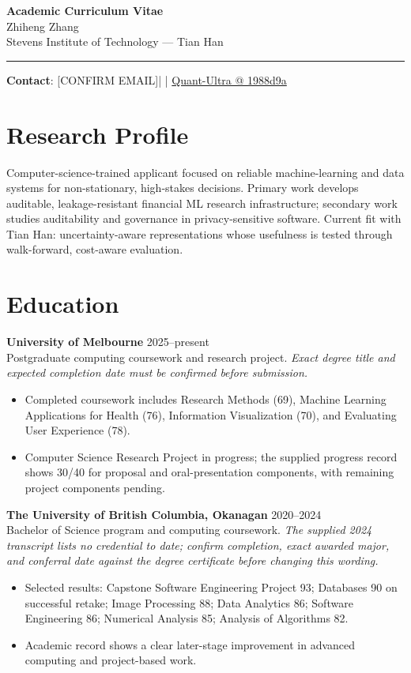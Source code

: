 \documentclass[11pt]{article}
\makeatletter
\newcommand{\ApplicantName}{Zhiheng Zhang}
\newcommand{\ApplicantEmail}{[CONFIRM EMAIL]}
\newcommand{\ApplicantPhone}{[CONFIRM PHONE]}
\newcommand{\ApplicantGitHub}{\href{https://github.com/zhiheng-zhang-Mera/Quant-Ultra/tree/1988d9a8530da91a8158de864d098ea869098923}{Quant-Ultra @ 1988d9a}}
\makeatother
\begin{document}
\begin{center}
{\LARGE\bfseries Academic Curriculum Vitae}\\[0.25em]
{\large \ApplicantName}\\
Stevens Institute of Technology --- Tian Han
\end{center}
\vspace{0.35em}\hrule\vspace{0.65em}

\textbf{Contact}: \ApplicantEmail\quad | \quad \ApplicantPhone\quad | \quad \ApplicantGitHub

\section*{Research Profile}
Computer-science-trained applicant focused on reliable machine-learning and data systems for non-stationary, high-stakes decisions. Primary work develops auditable, leakage-resistant financial ML research infrastructure; secondary work studies auditability and governance in privacy-sensitive software. Current fit with Tian Han: uncertainty-aware representations whose usefulness is tested through walk-forward, cost-aware evaluation.

\section*{Education}
\textbf{University of Melbourne} \hfill 2025--present\\
Postgraduate computing coursework and research project. \textit{Exact degree title and expected completion date must be confirmed before submission.}
\begin{itemize}
\item Completed coursework includes Research Methods (69), Machine Learning Applications for Health (76), Information Visualization (70), and Evaluating User Experience (78).
\item Computer Science Research Project in progress; the supplied progress record shows 30/40 for proposal and oral-presentation components, with remaining project components pending.
\end{itemize}

\textbf{The University of British Columbia, Okanagan} \hfill 2020--2024\\
Bachelor of Science program and computing coursework. \textit{The supplied 2024 transcript lists no credential to date; confirm completion, exact awarded major, and conferral date against the degree certificate before changing this wording.}
\begin{itemize}
\item Selected results: Capstone Software Engineering Project 93; Databases 90 on successful retake; Image Processing 88; Data Analytics 86; Software Engineering 86; Numerical Analysis 85; Analysis of Algorithms 82.
\item Academic record shows a clear later-stage improvement in advanced computing and project-based work.
\end{itemize}
\end{document}
